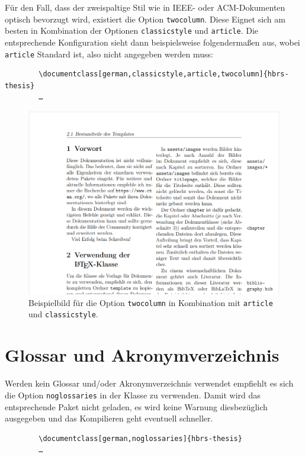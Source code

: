 Für den Fall, dass der zweispaltige Stil wie in IEEE- oder ACM-Dokumenten optisch bevorzugt wird, existiert die Option \texttt{twocolumn}. Diese Eignet sich am besten in Kombination der Optionen \texttt{classicstyle} und \texttt{article}. Die entsprechende Konfiguration sieht dann beispielsweise folgendermaßen aus, wobei \texttt{article} Standard ist, also nicht angegeben werden muss:

\begin{cde}
    \begin{verbatim}
        \documentclass[german,classicstyle,article,twocolumn]{hbrs-thesis}
        …
    \end{verbatim}
\end{cde}

\begin{figure}[H]
    \centering
    \includegraphics[width=0.8\columnwidth]{assets/images/klassenoptionen/twocolumn_classicstyle_article.png}
    \caption{Beispielbild für die Option \texttt{twocolumn} in Kombination mit \texttt{article} und \texttt{classicstyle}.}
\end{figure}

\section{Glossar und Akronymverzeichnis}
Werden kein Glossar und/oder Akronymverzeichnis verwendet empfiehlt es sich die Option \texttt{noglossaries} in der Klasse zu verwenden. Damit wird das entsprechende Paket nicht geladen, es wird keine Warnung diesbezüglich ausgegeben und das Kompilieren geht eventuell schneller.

\begin{cde}
    \begin{verbatim}
        \documentclass[german,noglossaries]{hbrs-thesis}
        …
    \end{verbatim}
\end{cde}